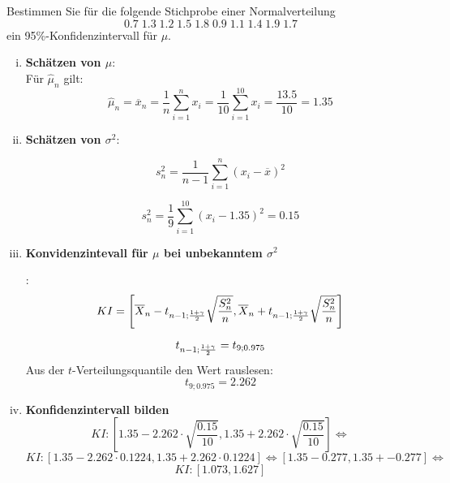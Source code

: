 \begin{uebsp}
\begin{Exercise}[label=ex:8.4]
Bestimmen Sie für die folgende Stichprobe einer Normalverteilung
\[0.7\;1.3\; 1.2\; 1.5\; 1.8\; 0.9\; 1.1\; 1.4\; 1.9\; 1.7\]
ein 95\%-Konfidenzintervall für $\mu$.
\end{Exercise}
\begin{Answer}
\begin{enumerate}[i)]
\item \textbf{Schätzen von $\mu$}:\\
Für $\hat\mu_n$ gilt: \[\hat\mu_n=\overline x_n=\frac{1}{n}\sum_{i=1}^nx_i=\frac{1}{10}\sum_{i=1}^{10}x_i=\frac{13.5}{10}=1.35\]
\item \textbf{Schätzen von $\sigma^2$}:
\begin{uebsp_theory}
\[s_n^2= \frac{1}{n-1} \sum_{i=1}^n\left(x_i-\overline x\right)^2\]
\end{uebsp_theory}
\[s_n^2= \frac{1}{9} \sum_{i=1}^{10}(x_i-1.35)^2=0.15\]

\item \textbf{Konvidenzintevall für $\mu$ bei unbekanntem $\sigma^2$}
\begin{uebsp_theory}
:
\[KI=\left[\overline X_n-t_{n-1;{1+\gamma\over 2}}\sqrt{S_n^2\over n},
\overline X_n+t_{n-1;{1+\gamma\over 2}}\sqrt{S_n^2\over n}\right]\]
\end{uebsp_theory}
\[t_{n-1;{1+\gamma\over 2}}=t_{9;{0.975}}\]
Aus  der $t$-Verteilungsquantile den Wert rauslesen:
\[t_{9;{0.975}}=2.262\]
\item \textbf{Konfidenzintervall bilden}
    \[KI:\left[1.35-2.262\cdot\sqrt{\frac{0.15}{10}},1.35+2.262\cdot\sqrt{\frac{0.15}{10}}\right]\Leftrightarrow\]
\[KI:\left[1.35-2.262\cdot0.1224,1.35+2.262\cdot0.1224\right]\Leftrightarrow\left[1.35-0.277,1.35+-0.277\right]\Leftrightarrow\]
\[KI:\left[1.073,1.627\right]\]
\end{enumerate}
\end{Answer}
\end{uebsp}

